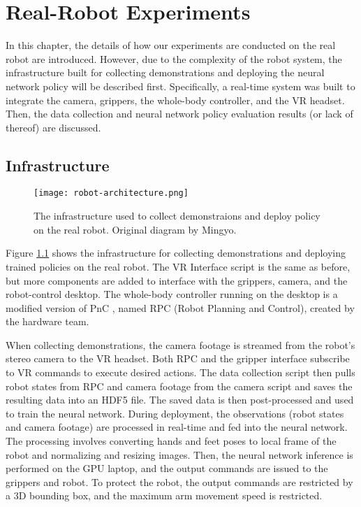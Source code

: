 \chapter{Real-Robot Experiments}

In this chapter, the details of how our experiments are conducted on the real robot are introduced. 
However, due to the complexity of the robot system, the infrastructure built for collecting demonstrations and deploying the neural network policy will be described first. Specifically, a real-time system was built to integrate the camera, grippers, the whole-body controller, and the VR headset. Then, the data collection and neural network policy evaluation results (or lack of thereof) are discussed. 

\section{Infrastructure}

\begin{figure}
	\centering
	\texttt{[image: robot-architecture.png]}
    \caption{The infrastructure used to collect demonstraions and deploy policy on the real robot. Original diagram by Mingyo.}
    \label{fig:robot-architecture}
\end{figure}

Figure \ref{fig:robot-architecture} shows the infrastructure for collecting demonstrations and deploying trained policies on the real robot. 
The VR Interface script is the same as before, but more components are added to interface with the grippers, camera, and the robot-control desktop. The whole-body controller running on the desktop is a modified version of PnC \cite{Ahn2021VersatileLP}, named RPC (Robot Planning and Control), created by the hardware team. 

When collecting demonstrations, the camera footage is streamed from the robot's stereo camera to the VR headset. Both RPC and the gripper interface subscribe to VR commands to execute desired actions. The data collection script then pulls robot states from RPC and camera footage from the camera script and saves the resulting data into an HDF5 file. The saved data is then post-processed and used to train the neural network. 
During deployment, the observations (robot states and camera footage) are processed in real-time and fed into the neural network. The processing involves converting hands and feet poses to local frame of the robot and normalizing and resizing images. Then, the neural network inference is performed on the GPU laptop, and the output commands are issued to the grippers and robot. To protect the robot, the output commands are restricted by a 3D bounding box, and the maximum arm movement speed is restricted. 

